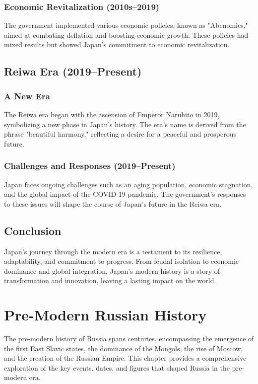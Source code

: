 \documentclass[a4paper,12pt]{book}
\begin{document}
\subsection{Economic Revitalization (2010s–2019)}
The government implemented various economic policies, known as "Abenomics," aimed at combating deflation and boosting economic growth. These policies had mixed results but showed Japan’s commitment to economic revitalization.

\section{Reiwa Era (2019–Present)}
\label{sec:reiwa-era}
\subsection{A New Era}
The Reiwa era began with the ascension of Emperor Naruhito in 2019, symbolizing a new phase in Japan’s history. The era's name is derived from the phrase "beautiful harmony," reflecting a desire for a peaceful and prosperous future.

\subsection{Challenges and Responses (2019–Present)}
Japan faces ongoing challenges such as an aging population, economic stagnation, and the global impact of the COVID-19 pandemic. The government’s responses to these issues will shape the course of Japan’s future in the Reiwa era.

\section{Conclusion}
\label{sec:conclusion-modern-japan}
Japan’s journey through the modern era is a testament to its resilience, adaptability, and commitment to progress. From feudal isolation to economic dominance and global integration, Japan’s modern history is a story of transformation and innovation, leaving a lasting impact on the world.

\chapter{Pre-Modern Russian History}
\label{ch:pre-modern-russian-history}

The pre-modern history of Russia spans centuries, encompassing the emergence of the first East Slavic states, the dominance of the Mongols, the rise of Moscow, and the creation of the Russian Empire. This chapter provides a comprehensive exploration of the key events, dates, and figures that shaped Russia in the pre-modern era.
\end{document}
